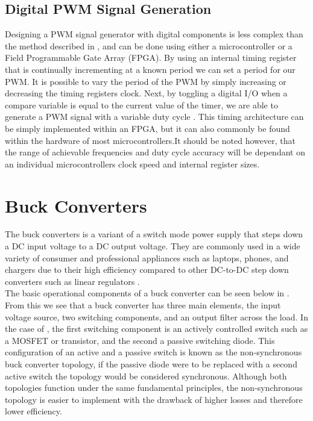 \subsection{Digital PWM Signal Generation}\label{S:digital_PWM_back}

Designing a PWM signal generator with digital components is less complex than the method described in , and can be done using either a microcontroller or a Field Programmable Gate Array (FPGA). By using an internal timing register that is continually incrementing at a known period we can set a period for our PWM. It is possible to vary the period of the PWM by simply increasing or decreasing the timing registers clock. Next, by toggling a digital I/O when a compare variable is equal to the current value of the timer, we are able to generate a PWM signal with a variable duty cycle \cite{Colley2020}. 
This timing architecture can be simply implemented within an FPGA, but it can also commonly be found within the hardware of most microcontrollers.It should be noted however, that the range of achievable frequencies and duty cycle accuracy will be dependant on an individual microcontrollers clock speed and internal register sizes.

\section{Buck Converters}\label{S:buck_back}

The buck converters is a variant of a switch mode power supply that steps down a DC input voltage to a DC output voltage. They are commonly used in a wide variety of consumer and professional appliances such as laptops, phones, and chargers due to their high efficiency compared to other DC-to-DC step down converters such as linear regulators \cite{Mohan2012}.\\

The basic operational components of a buck converter can be seen below in . From this we see that a buck converter has three main elements, the input voltage source, two switching components, and an output filter across the load. In the case of , the first switching component is an actively controlled switch such as a MOSFET or transistor, and the second a passive switching diode. This configuration of an active and a passive switch is known as the non-synchronous buck converter topology, if the passive diode were to be replaced with a second active switch the topology would be considered synchronous. Although both topologies function under the same fundamental principles, the non-synchronous topology is easier to implement with the drawback of higher losses and therefore lower efficiency.\\


